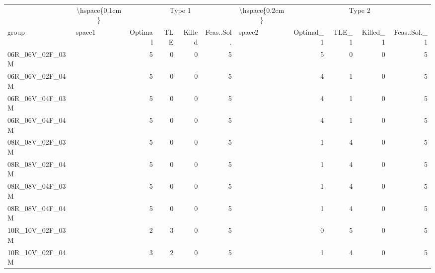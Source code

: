 
\begin{tabular}{llrrrrlrrrr}
\toprule
\multicolumn{1}{c}{} & \multicolumn{1}{c}{\textbackslash{}hspace\{0.1cm\}} & \multicolumn{4}{c}{Type 1} & \multicolumn{1}{c}{\textbackslash{}hspace\{0.2cm\}} & \multicolumn{4}{c}{Type 2} \\
\cmidrule(l{3pt}r{3pt}){2-2} \cmidrule(l{3pt}r{3pt}){3-6} \cmidrule(l{3pt}r{3pt}){7-7} \cmidrule(l{3pt}r{3pt}){8-11}
group & space1 & Optimal & TLE & Killed & Feas..Sol. & space2 & Optimal\_1 & TLE\_1 & Killed\_1 & Feas..Sol.\_1\\
\midrule
06R\_06V\_02F\_03M & \hspace{0.1cm} & 5 & 0 & 0 & 5 & \hspace{0.2cm} & 5 & 0 & 0 & 5\\
06R\_06V\_02F\_04M & \hspace{0.1cm} & 5 & 0 & 0 & 5 & \hspace{0.2cm} & 4 & 1 & 0 & 5\\
06R\_06V\_04F\_03M & \hspace{0.1cm} & 5 & 0 & 0 & 5 & \hspace{0.2cm} & 4 & 1 & 0 & 5\\
06R\_06V\_04F\_04M & \hspace{0.1cm} & 5 & 0 & 0 & 5 & \hspace{0.2cm} & 4 & 1 & 0 & 5\\
\addlinespace
08R\_08V\_02F\_03M & \hspace{0.1cm} & 5 & 0 & 0 & 5 & \hspace{0.2cm} & 1 & 4 & 0 & 5\\
08R\_08V\_02F\_04M & \hspace{0.1cm} & 5 & 0 & 0 & 5 & \hspace{0.2cm} & 1 & 4 & 0 & 5\\
08R\_08V\_04F\_03M & \hspace{0.1cm} & 5 & 0 & 0 & 5 & \hspace{0.2cm} & 1 & 4 & 0 & 5\\
08R\_08V\_04F\_04M & \hspace{0.1cm} & 5 & 0 & 0 & 5 & \hspace{0.2cm} & 1 & 4 & 0 & 5\\
\addlinespace
10R\_10V\_02F\_03M & \hspace{0.1cm} & 2 & 3 & 0 & 5 & \hspace{0.2cm} & 0 & 5 & 0 & 5\\
10R\_10V\_02F\_04M & \hspace{0.1cm} & 3 & 2 & 0 & 5 & \hspace{0.2cm} & 1 & 4 & 0 & 5\\

\end{tabular}
